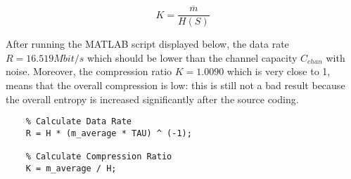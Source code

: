 \begin{equation*}
    K = \frac{\overline{m}}{H(S)}
\end{equation*}

\noindent After running the MATLAB script displayed below, the data rate $R = 16.519 Mbit/s$ which should be lower than the channel capacity $C_{chan}$ with noise. Moreover, the compression ratio $K = 1.0090$ which is very close to 1, means that the overall compression is low: this is still not a bad result because the overall entropy is increased significantly after the source coding.

\begin{lstlisting}
    % Calculate Data Rate
    R = H * (m_average * TAU) ^ (-1);

    % Calculate Compression Ratio
    K = m_average / H;
\end{lstlisting}
